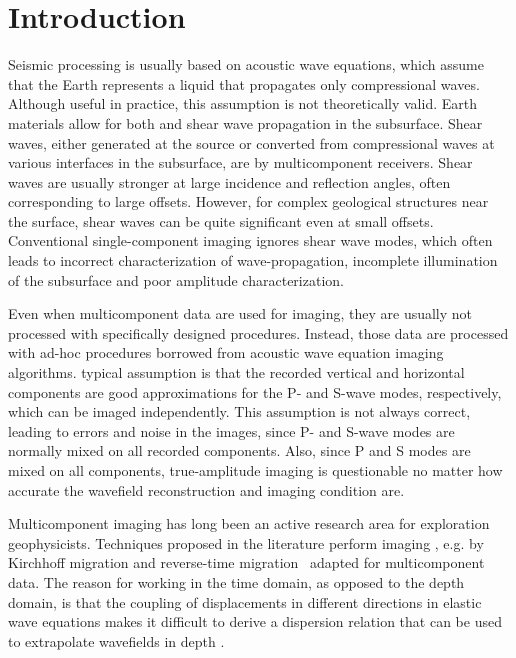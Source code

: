 \section{Introduction}

Seismic processing is usually based on acoustic wave equations, which
assume that the Earth represents a liquid that propagates only
compressional waves. Although useful in practice, this assumption is
not theoretically valid.  Earth materials allow for both 
 and shear wave propagation in the
subsurface. Shear waves, either generated at the source or converted
from compressional waves at various interfaces in the subsurface, are
  by multicomponent receivers.  Shear
waves are usually stronger at large incidence and reflection angles,
often corresponding to large offsets. However, for complex geological
structures near the surface, shear waves can be quite significant even
at small offsets.  Conventional single-component imaging ignores shear
wave modes, which often leads to incorrect characterization of
wave-propagation, incomplete illumination of the subsurface and poor
amplitude characterization.

Even when multicomponent data are used for imaging, they are usually
not processed with specifically designed procedures. Instead, those
data are processed with ad-hoc procedures borrowed from acoustic wave
equation imaging algorithms.  
 typical assumption is that the recorded vertical and
 horizontal components are good approximations for the
P- and S-wave modes, respectively, which can be imaged
independently. This assumption is not always correct, leading to
errors and noise in the images, since P- and S-wave modes are normally
mixed on all recorded components. Also, since P and S modes are mixed
on all components, true-amplitude imaging is questionable no matter
how accurate the wavefield reconstruction and imaging condition are.

Multicomponent imaging has long been an active research area for
exploration geophysicists.  Techniques proposed in the literature
perform imaging  , e.g. by Kirchhoff migration
\cite[]{kuo:1223,hokstad:861} and reverse-time
migration~\cite[]{whitmore.thesis,chang:67,chang:597} adapted for
multicomponent data. The reason for working in the time domain, as
opposed to the depth domain, is that the coupling of displacements in
different directions in elastic wave equations makes it difficult to
derive a dispersion relation that can be used to extrapolate
wavefields in depth \cite[]{Clayton.sep.20.73,Clayton.thesis}.


